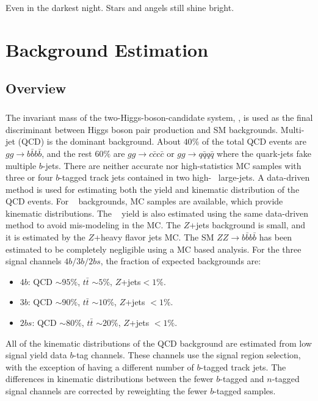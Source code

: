 \begin{savequote}[75mm]
Even in the darkest night. Stars and angels still shine bright.   
\end{savequote}


\chapter{Background Estimation}

\section{Overview}
\paragraph{}
The invariant mass of the two-Higgs-boson-candidate system, \mtwoJ, is used as the final discriminant between Higgs boson pair production and SM backgrounds.
Multi-jet (QCD) is the dominant background.
About $40\%$ of the total QCD events are $gg \to b\bar{b}b\bar{b}$, and the rest $60\%$ are $gg \to c\bar{c}c\bar{c}$ or $gg \to q\bar{q}q\bar{q}$ where the quark-jets fake multiple $b$-jets.
There are neither accurate nor high-statistics MC samples with three or four $b$-tagged track jets contained in two high-\pt~ large-\R jets.
A data-driven method is used for estimating both the yield and kinematic distribution of the QCD events.
For \ttbar~ backgrounds, MC samples are available, which provide \ttbar~ kinematic distributions.
The \ttbar~ yield is also estimated using the same data-driven method to avoid mis-modeling in the MC.
The $Z$+jets background is small, and it is estimated by the $Z$+heavy flavor jets MC.
The SM $ZZ\to b\bar{b}b\bar{b}$ has been estimated to be completely negligible using a MC based analysis.
For the three signal channels $4b/3b/2bs$, the fraction of expected backgrounds are:
\begin{itemize}
	\item $4b$: QCD $\sim 95\%$, $t\bar{t}$ $\sim 5\%$, $Z$+jets$< 1\%$. 
	\item $3b$: QCD $\sim 90\%$, $t\bar{t}$ $\sim 10\%$, $Z$+jets $< 1\%$.  
	\item $2bs$: QCD $\sim 80\%$, $t\bar{t}$ $\sim 20\%$, $Z$+jets $< 1\%$.
\end{itemize}

All of the kinematic distributions of the QCD background are estimated from low signal yield data $b$-tag channels.
These channels use the signal region selection, with the exception of having a different number of $b$-tagged track jets.
The differences in kinematic distributions between the fewer $b$-tagged and $n$-tagged signal channels are corrected by reweighting the fewer $b$-tagged samples.

